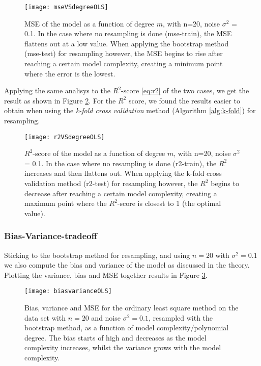 \begin{figure}[htbp]
	\centering
	\texttt{[image: mseVSdegreeOLS]}
	\caption{MSE of the model as a function of degree $m$, with n=20, noise $\sigma^2$ = 0.1. In the case where no resampling is done (mse-train), the MSE flattens out at a low value. When applying the bootstrap method (mse-test) for resampling however, the MSE begins to rise after reaching a certain model complexity, creating a minimum point where the error is the lowest.}
	\label{fig:mseVSdegreeOLS}
\end{figure}

Applying the same analisys to the $R^2$-score \eqref{eq:r2} of the two cases, we get the result as shown in Figure \ref{fig:r2VSdegreeOLS}. For the $R^2$ score, we found the results easier to obtain when using the \emph{k-fold cross validation} method (Algorithm \ref{alg:k-fold}) for resampling.
\begin{figure}[htbp]
	\centering
	\texttt{[image: r2VSdegreeOLS]}
	\caption{$R^2$-score of the model as a function of degree $m$, with n=20, noise $\sigma^2$ = 0.1. In the case where no resampling is done (r2-train), the $R^2$ increases and then flattens out. When applying the k-fold cross validation method (r2-test) for resampling however, the $R^2$ begins to decrease after reaching a certain model complexity, creating a maximum point where the $R^2$-score is closest to 1 (the optimal value).}
	\label{fig:r2VSdegreeOLS}
\end{figure}

\subsubsection{Bias-Variance-tradeoff}
Sticking to the bootstrap method for resampling, and using $n=20$ with $\sigma^2 = 0.1$ we also compute the bias and variance of the model as discussed in the theory. Plotting the variance, bias and MSE together results in Figure \ref{fig:biasvarianceOLS}.

\begin{figure}[htbp]
	\centering
	\texttt{[image: biasvarianceOLS]}
	\caption{Bias, variance and MSE for the ordinary least square method on the data set with $n=20$ and noise $\sigma^2=0.1$, resampled with the bootstrap method, as a function of model complexity/polynomial degree. The bias starts of high and decreases as the model complexity increases, whilst the variance grows with the model complexity.}
	\label{fig:biasvarianceOLS}
\end{figure}

